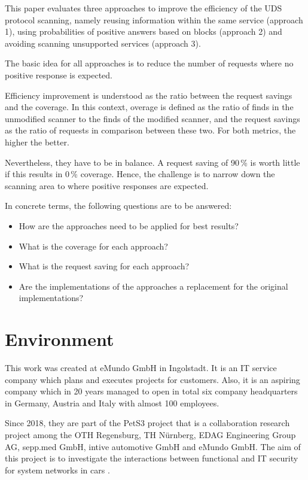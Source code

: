 This paper evaluates three approaches to improve the efficiency of the UDS protocol scanning, namely reusing information within the same service (approach 1), using probabilities of positive answers based on blocks (approach 2) and avoiding scanning unsupported services (approach 3).

The basic idea for all approaches is to reduce the number of requests where no positive response is expected.

Efficiency improvement is understood as the ratio between the request savings and the coverage. In this context, overage is defined as the ratio of finds in the unmodified scanner to the finds of the modified scanner, and the request savings as the ratio of requests in comparison between these two. For both metrics, the higher the better.

Nevertheless, they have to be in balance. A request saving of 90\,\% is worth little if this results in 0\,\% coverage. Hence, the challenge is to narrow down the scanning area to where positive responses are expected.

In concrete terms, the following questions are to be answered:

\begin{itemize}
    \item How are the approaches need to be applied for best results?
    \item What is the coverage for each approach?
    \item What is the request saving for each approach?
    \item Are the implementations of the approaches a replacement for the original implementations?
\end{itemize}


\section{Environment}
This work was created at eMundo GmbH in Ingolstadt. It is an IT service company which plans and executes projects for customers. Also, it is an aspiring company which in 20 years managed to open in total six company headquarters in Germany, Austria and Italy with almost 100 employees.

Since 2018, they are part of the PetS3 project that is a collaboration research project among the OTH Regensburg, TH Nürnberg, EDAG Engineering Group AG, sepp.med GmbH, intive automotive GmbH and eMundo GmbH. The aim of this project is to investigate the interactions between functional and IT security for system networks in cars \cite{pets3}.

